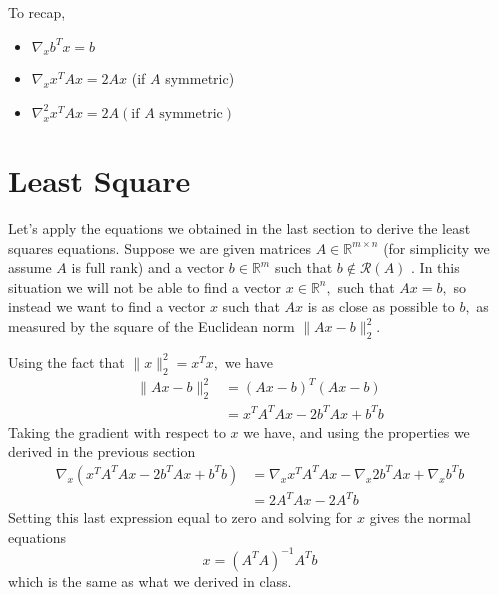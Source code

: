 \documentclass[10pt,a4paper,oneside]{article}
\begin{document}
To recap,
\begin{itemize}
\item \(\nabla_{x} b^{T} x=b\)
\item \(\nabla_{x} x^{T} A x=2 A x\) (if \(A\) symmetric)
\item \(\nabla_{x}^{2} x^{T} A x=2 A(\text {if } A \text { symmetric})\)
\end{itemize}
\section{Least Square}
Let's apply the equations we obtained in the last section to derive the least squares equations. Suppose we are given matrices \(A \in \mathbb{R}^{m \times n}\) (for simplicity we assume \(A\) is full rank) and a vector \(b \in \mathbb{R}^{m}\) such that \(b \notin \mathcal{R}(A)\) . In this situation we will not be able to find a vector \(x \in \mathbb{R}^{n},\) such that \(A x=b,\) so instead we want to find a vector \(x\) such that \(A x\) is as close as possible to \(b,\) as measured by the square of the Euclidean norm \(\|A x-b\|_{2}^{2}\).

Using the fact that \(\|x\|_{2}^{2}=x^{T} x,\) we have
\[
\begin{aligned}\|A x-b\|_{2}^{2} &=(A x-b)^{T}(A x-b) \\ &=x^{T} A^{T} A x-2 b^{T} A x+b^{T} b \end{aligned}
\]
Taking the gradient with respect to \(x\) we have, and using the properties we derived in the previous section
\[
\begin{aligned} \nabla_{x}\left(x^{T} A^{T} A x-2 b^{T} A x+b^{T} b\right) &=\nabla_{x} x^{T} A^{T} A x-\nabla_{x} 2 b^{T} A x+\nabla_{x} b^{T} b \\ &=2 A^{T} A x-2 A^{T} b \end{aligned}
\]
Setting this last expression equal to zero and solving for \(x\) gives the normal equations
\[
x=\left(A^{T} A\right)^{-1} A^{T} b
\]
which is the same as what we derived in class.
\end{document}
